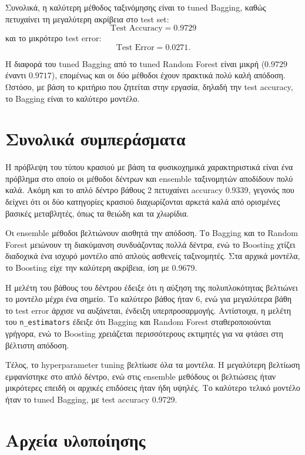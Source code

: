 \documentclass[12pt,a4paper]{article}
\newcommand{\code}[1]{\texttt{\textenglish{#1}}}
\begin{document}
Συνολικά, η καλύτερη μέθοδος ταξινόμησης είναι το tuned Bagging, καθώς
πετυχαίνει τη μεγαλύτερη ακρίβεια στο test set:
\[
    \text{Test Accuracy}=0.9729
\]
και το μικρότερο test error:
\[
    \text{Test Error}=0.0271.
\]

Η διαφορά του tuned Bagging από το tuned Random Forest είναι μικρή
($0.9729$ έναντι $0.9717$), επομένως και οι δύο μέθοδοι έχουν πρακτικά πολύ
καλή απόδοση. Ωστόσο, με βάση το κριτήριο που ζητείται στην εργασία, δηλαδή
την test accuracy, το Bagging είναι το καλύτερο μοντέλο.

\section{Συνολικά συμπεράσματα}

Η πρόβλεψη του τύπου κρασιού με βάση τα φυσικοχημικά χαρακτηριστικά είναι ένα
πρόβλημα στο οποίο οι μέθοδοι δέντρων και ensemble ταξινομητών αποδίδουν πολύ
καλά. Ακόμη και το απλό δέντρο βάθους 2 πετυχαίνει accuracy 0.9339, γεγονός
που δείχνει ότι οι δύο κατηγορίες κρασιού διαχωρίζονται αρκετά καλά από
ορισμένες βασικές μεταβλητές, όπως τα θειώδη και τα χλωρίδια.

Οι ensemble μέθοδοι βελτιώνουν αισθητά την απόδοση. Το Bagging και το Random
Forest μειώνουν τη διακύμανση συνδυάζοντας πολλά δέντρα, ενώ το Boosting
χτίζει διαδοχικά ένα ισχυρό μοντέλο από απλούς ασθενείς ταξινομητές. Στα
αρχικά μοντέλα, το Boosting είχε την καλύτερη ακρίβεια, ίση με 0.9679.

Η μελέτη του βάθους του δέντρου έδειξε ότι η αύξηση της πολυπλοκότητας
βελτιώνει το μοντέλο μέχρι ένα σημείο. Το καλύτερο βάθος ήταν 6, ενώ για
μεγαλύτερα βάθη το test error άρχισε να αυξάνεται, ένδειξη υπερπροσαρμογής.
Αντίστοιχα, η μελέτη του \code{n\_estimators} έδειξε ότι Bagging και Random
Forest σταθεροποιούνται γρήγορα, ενώ το Boosting χρειάζεται περισσότερους
εκτιμητές για να φτάσει στη βέλτιστη απόδοση.

Τέλος, το hyperparameter tuning βελτίωσε όλα τα μοντέλα. Η μεγαλύτερη
βελτίωση εμφανίστηκε στο απλό δέντρο, ενώ στις ensemble μεθόδους οι βελτιώσεις
ήταν μικρότερες επειδή οι αρχικές επιδόσεις ήταν ήδη υψηλές. Το καλύτερο
τελικό μοντέλο ήταν το tuned Bagging, με test accuracy 0.9729.

\appendix
\section{Αρχεία υλοποίησης}
\end{document}
